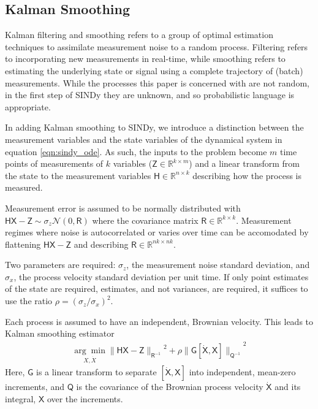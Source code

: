 \documentclass{article}
\newcommand{\mat}[1]{\boldsymbol{\mathsf{#1}}}
\newcommand{\R}[1]{\mathbb{R}^{#1}}
\begin{document}
\subsection{Kalman Smoothing}


Kalman filtering and smoothing refers to a group of optimal estimation techniques to assimilate measurement noise to a random process.  Filtering refers to incorporating  new measurements in real-time, while smoothing refers to estimating the underlying state or signal using a complete trajectory of (batch) measurements.  While the processes this paper is concerned with are not random, in the first step of SINDy they are unknown, and so probabilistic language is appropriate.


In adding Kalman smoothing to SINDy, we introduce a distinction between the measurement variables and the state variables of the dynamical system in equation
\ref{eqn:sindy_ode}.  As such, the inputs to the problem become $m$ time points of measurements of $k$ variables ($\mat Z\in \R{k\times m}$) and a linear transform from the state to the measurement variables $\mat H \in \R{n \times k}$ describing how the process is measured.

Measurement error is assumed to be normally distributed with $\mat H \mat X - \mat Z \sim \sigma_z \mathcal N(0, \mat R)$ where the covariance matrix $\mat R\in\R{k \times k}$.  Measurement regimes where noise is autocorrelated or varies over time can be accomodated by flattening $\mat H \mat X - \mat Z$ and describing $\mat R\in\R{nk \times nk}$.

Two parameters are required: $\sigma_z$, the measurement noise standard deviation, and $\sigma_x$, the process velocity standard deviation per unit time.  If only point estimates of the state are required,  estimates, and not variances, are required, it suffices to use the ratio $\rho = (\sigma_z / \sigma_x)^2$.

Each process is assumed to have an independent, Brownian velocity.  This leads to Kalman smoothing estimator
\begin{align}
    \underset{X, \dot X}{\arg\min}{\|\mat H \mat X - \mat Z\|_{\mat R^{-1}}}^2 + \rho {\|\mat G [\mat {\dot X}, \mat X]\|_{\mat Q^{-1}}}^2
\end{align}
Here, $\mat G$ is a linear transform to separate $[\mat{\dot X}, \mat X]$ into independent, mean-zero increments, and $\mat Q$ is the covariance of the Brownian process velocity $\mat{\dot X}$ and its integral, $\mat X$ over the increments.
\end{document}
